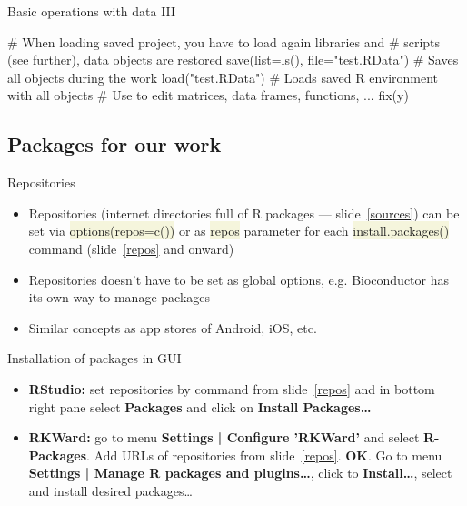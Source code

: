 \documentclass[compress, ucs, xelatex, 11pt, xcolor=svgnames, aspectratio=169,
	hyperref={
		bookmarks=true,
		unicode=true,
		colorlinks=true,
		pdftitle={Molecular data in R},
		plainpages=false,
		pdfauthor={Vojtech Zeisek},
		pdfsubject={Course about phylogeny and evolution in R},
		pdfcreator={XeLaTeX},
		pdfkeywords={R, evolution, phylogeny, molecular data},
		linkcolor=Crimson, %
		anchorcolor=Magenta, %
		citecolor=Magenta, %
		filecolor=Magenta, %
		menucolor=Magenta, %
		urlcolor=DodgerBlue, %
		pdftex},
	url={hyphens, lowtilde} %
	]{beamer}
\renewcommand{\texttt}[1]{\colorbox{Beige}{{\ttfamily #1}}}
\begin{document}
\begin{frame}[fragile]{Basic operations with data III} %
	\begin{spluscode}
    # When loading saved project, you have to load again libraries and
    # scripts (see further), data objects are restored
    save(list=ls(), file="test.RData") # Saves all objects during the work
    load("test.RData") # Loads saved R environment with all objects
    # Use to edit matrices, data frames, functions, ...
    fix(y)
	\end{spluscode}
\end{frame}

\subsection{Packages for our work}

\begin{frame}{Repositories}
	\begin{itemize}
		\item Repositories (internet directories full of R packages --- slide~\ref{sources}) can be set via \texttt{options(repos=c())} or as \texttt{repos} parameter for each \texttt{install.packages()} command (slide~\ref{repos} and onward)
		\item Repositories doesn't have to be set as global options, e.g. Bioconductor has its own way to manage packages
		\item Similar concepts as app stores of Android, iOS, etc.
	\end{itemize}
	\begin{block}{Installation of packages in GUI}
		\begin{itemize}
			\item \textbf{RStudio:} set repositories by command from slide~\ref{repos} and in bottom right pane select \textbf{Packages} and click on \textbf{Install Packages\ldots}
			\item \textbf{RKWard:} go to menu \textbf{Settings | Configure 'RKWard'} and select \textbf{R-Packages}. Add URLs of repositories from slide~\ref{repos}. \textbf{OK}. Go to menu \textbf{Settings | Manage R packages and plugins\ldots}, click to \textbf{Install\ldots}, select and install desired packages\ldots
		\end{itemize}
	\end{block}
\end{frame}
\end{document}
